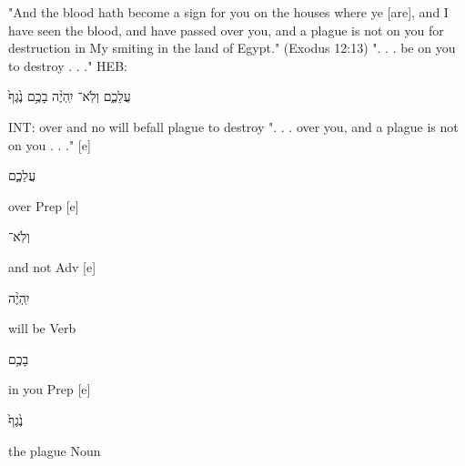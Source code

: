 \documentclass[11pt]{article}
\begin{document}
"And the blood hath become a sign for you on the houses where ye [are], and I have seen the blood, and have passed over you, and a plague is not on you for destruction in My smiting in the land of Egypt."
(Exodus 12:13) \newline
". . . be on you to destroy . . ."\newline
HEB: \begin{hebrew} עֲלֵכֶ֑ם וְלֹֽא־ יִֽהְיֶ֨ה בָכֶ֥ם נֶ֙גֶף֙ \end{hebrew} \newline
INT: over and no will befall plague to destroy \newline
". . . over you, and a plague is not on you . . ."  [e]	%
\begin{hebrew}	עֲלֵכֶ֑ם	\end{hebrew}over	Prep  [e]	%
\begin{hebrew}	וְלֹֽא־\end{hebrew}	and not	Adv  [e]	%
\begin{hebrew}	יִֽהְיֶ֨ה	\end{hebrew}will be	Verb \newline
\phantom{1961 [e]	} \begin{hebrew}בָכֶ֥ם\end{hebrew}	in you	Prep  [e]	%
\begin{hebrew}נֶ֙גֶף֙\end{hebrew}	the plague	Noun \newline \newline 
\end{document}
